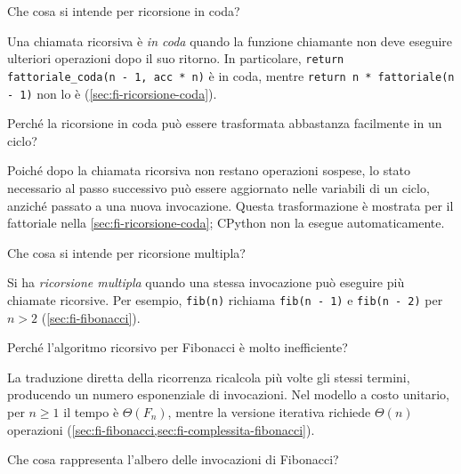 \begin{exercise}
\label{ex:fi-esercizi-ricorsione-coda}
Che cosa si intende per ricorsione in coda?
\end{exercise}

Una chiamata ricorsiva è \emph{in coda} quando la funzione chiamante
non deve eseguire ulteriori operazioni dopo il suo ritorno. In
particolare, \texttt{return fattoriale\_coda(n - 1, acc * n)}
è in coda, mentre \texttt{return n * fattoriale(n - 1)}
non lo è (\cref{sec:fi-ricorsione-coda}).

\clearpage

\begin{exercise}
\label{ex:fi-esercizi-ricorsione-coda-ciclo}
Perché la ricorsione in coda può essere trasformata abbastanza
facilmente in un ciclo?
\end{exercise}

Poiché dopo la chiamata ricorsiva non restano operazioni sospese,
lo stato necessario al passo successivo può essere aggiornato
nelle variabili di un ciclo, anziché passato a una nuova
invocazione. Questa trasformazione è mostrata per il fattoriale
nella \cref{sec:fi-ricorsione-coda}; CPython non la esegue
automaticamente.

\begin{exercise}
\label{ex:fi-esercizi-ricorsione-multipla}
Che cosa si intende per ricorsione multipla?
\end{exercise}

Si ha \emph{ricorsione multipla} quando una stessa invocazione può
eseguire più chiamate ricorsive. Per esempio, \texttt{fib(n)}
richiama \texttt{fib(n - 1)} e \texttt{fib(n - 2)} per \(n>2\)
(\cref{sec:fi-fibonacci}).

\begin{exercise}
\label{ex:fi-esercizi-ricorsione-fibonacci-inefficiente}
Perché l'algoritmo ricorsivo per Fibonacci è molto inefficiente?
\end{exercise}

La traduzione diretta della ricorrenza ricalcola più volte gli stessi
termini, producendo un numero esponenziale di invocazioni. Nel
modello a costo unitario, per \(n\ge1\) il tempo è
\(\Theta(F_n)\), mentre la versione iterativa richiede \(\Theta(n)\) operazioni
(\cref{sec:fi-fibonacci,sec:fi-complessita-fibonacci}).

\begin{exercise}
\label{ex:fi-esercizi-ricorsione-fibonacci-albero}
Che cosa rappresenta l'albero delle invocazioni di Fibonacci?
\end{exercise}

